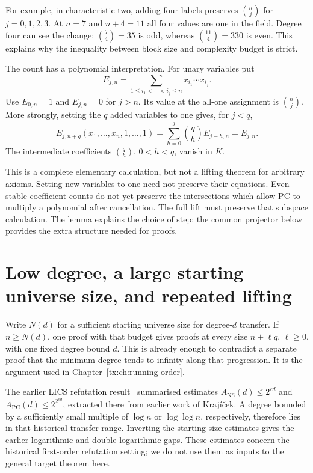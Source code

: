\documentclass[11pt,a4paper,oneside,openany]{book}
\theoremstyle{definition}\newtheorem{definition}[theorem]{Definition}
\theoremstyle{remark}\newtheorem{remark}[theorem]{Remark}
\newcommand{\NS}{\mathrm{NS}}\newcommand{\PC}{\mathrm{PC}}
\numberwithin{equation}{chapter}
\begin{document}
For example, in characteristic two, adding four labels preserves
$\binom nj$ for $j=0,1,2,3$. At $n=7$ and $n+4=11$ all four values
are one in the field. Degree four can see the change:
$\binom74=35$ is odd, whereas $\binom{11}4=330$ is even.
This explains why the inequality between block size and complexity
budget is strict.

The count has a polynomial interpretation. For unary variables put
\[
 E_{j,n}=\sum_{1\le i_1<\cdots<i_j\le n}
                           x_{i_1}\cdots x_{i_j}.
\]
Use $E_{0,n}=1$ and $E_{j,n}=0$ for $j>n$.
Its value at the all-one assignment is $\binom nj$.
More strongly, setting the $q$ added variables to one gives, for $j<q$,
\[
 E_{j,n+q}(x_1,\ldots,x_n,1,\ldots,1)
   =\sum_{h=0}^j\binom qh E_{j-h,n}=E_{j,n}.
\]
The intermediate coefficients $\binom qh$, $0<h<q$, vanish in $K$.

This is a complete elementary calculation, but not a lifting theorem
for arbitrary axioms. Setting new variables to one need not preserve
their equations. Even stable coefficient counts do not yet preserve
the intersections which allow PC to multiply a polynomial after
cancellation. The full lift must preserve that subspace calculation.
The lemma explains the choice of step; the common projector below
provides the extra structure needed for proofs.

\section{Low degree, a large starting universe size, and repeated lifting}
Write $N(d)$ for a sufficient starting universe size for degree-$d$ transfer.
If $n\ge N(d)$, one proof with that budget gives proofs at every
size $n+\ell q$, $\ell\ge0$, with one fixed degree bound $d$.
This is already enough to contradict a separate proof that the
minimum degree tends to infinity along that progression. It is the
argument used in Chapter~\ref{tx:ch:running-order}.

The earlier LICS refutation result~\cite[p.~276]{Riis} summarised
estimates $A_{\NS}(d)\le2^{cd}$ and
$A_{\PC}(d)\le2^{2^{cd}}$, extracted there from earlier work of
Kraj\'i\v cek. A degree bounded by a sufficiently small multiple of
$\log n$ or $\log\log n$, respectively, therefore lies in that
historical transfer range. Inverting the starting-size estimates gives
the earlier logarithmic and double-logarithmic gaps.
These estimates concern the historical first-order refutation setting;
we do not use them as inputs to the general target theorem here.
\end{document}
